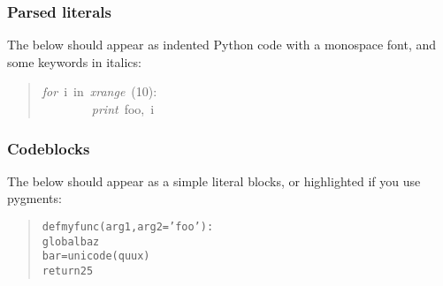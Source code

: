 \documentclass[t]{beamer}
\begin{document}
\begin{frame}[fragile]
\frametitle{Parsed literals}


The below should appear as indented Python code with a monospace font, and
some keywords in italics:
%
\begin{quote}
{\ttfamily \raggedright \noindent
\emph{for}~i~in~\emph{xrange}~(10):\\
~~~~~~~~\emph{print}~\textquotedbl{}foo\textquotedbl{},~i
}
\end{quote}

\end{frame}

\begin{frame}[fragile]
\frametitle{Codeblocks}


The below should appear as a simple literal blocks, or highlighted if you use pygments:
%
\begin{quote}
\begin{alltt}
def myfunc (arg1, arg2='foo'):
        global baz
        bar = unicode (quux)
        return 25
\end{alltt}
\end{quote}

\end{frame}
\end{document}
